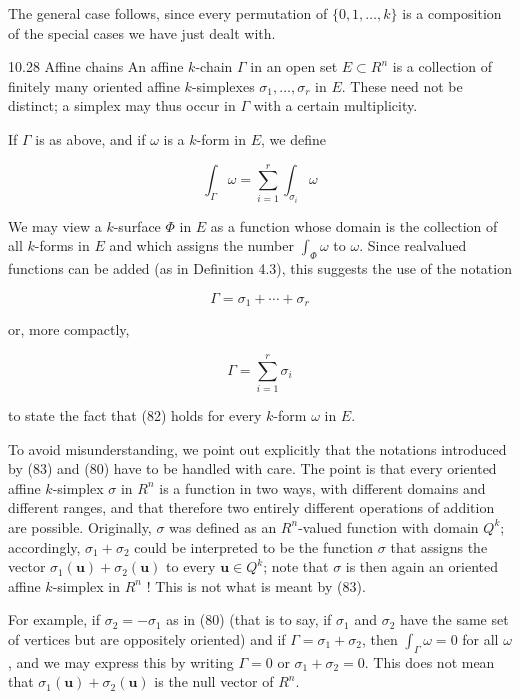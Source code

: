 \documentclass[10pt]{article}
\begin{document}
The general case follows, since every permutation of $\{0,1, \ldots, k\}$ is a composition of the special cases we have just dealt with.

10.28 Affine chains An affine $k$-chain $\Gamma$ in an open set $E \subset R^{n}$ is a collection of finitely many oriented affine $k$-simplexes $\sigma_{1}, \ldots, \sigma_{r}$ in $E$. These need not be distinct; a simplex may thus occur in $\Gamma$ with a certain multiplicity.

If $\Gamma$ is as above, and if $\omega$ is a $k$-form in $E$, we define

$$
\int_{\Gamma} \omega=\sum_{i=1}^{r} \int_{\sigma_{i}} \omega
$$

We may view a $k$-surface $\Phi$ in $E$ as a function whose domain is the collection of all $k$-forms in $E$ and which assigns the number $\int_{\Phi} \omega$ to $\omega$. Since realvalued functions can be added (as in Definition 4.3), this suggests the use of the notation

$$
\Gamma=\sigma_{1}+\cdots+\sigma_{r}
$$

or, more compactly,

$$
\Gamma=\sum_{i=1}^{r} \sigma_{i}
$$

to state the fact that (82) holds for every $k$-form $\omega$ in $E$.

To avoid misunderstanding, we point out explicitly that the notations introduced by (83) and (80) have to be handled with care. The point is that every oriented affine $k$-simplex $\sigma$ in $R^{n}$ is a function in two ways, with different domains and different ranges, and that therefore two entirely different operations of addition are possible. Originally, $\sigma$ was defined as an $R^{n}$-valued function with domain $Q^{k}$; accordingly, $\sigma_{1}+\sigma_{2}$ could be interpreted to be the function $\sigma$ that assigns the vector $\sigma_{1}(\mathbf{u})+\sigma_{2}(\mathbf{u})$ to every $\mathbf{u} \in Q^{k}$; note that $\sigma$ is then again an oriented affine $k$-simplex in $R^{n}$ ! This is not what is meant by (83).

For example, if $\sigma_{2}=-\sigma_{1}$ as in (80) (that is to say, if $\sigma_{1}$ and $\sigma_{2}$ have the same set of vertices but are oppositely oriented) and if $\Gamma=\sigma_{1}+\sigma_{2}$, then $\int_{\Gamma} \omega=0$ for all $\omega$, and we may express this by writing $\Gamma=0$ or $\sigma_{1}+\sigma_{2}=0$. This does not mean that $\sigma_{1}(\mathbf{u})+\sigma_{2}(\mathbf{u})$ is the null vector of $R^{n}$.
\end{document}
